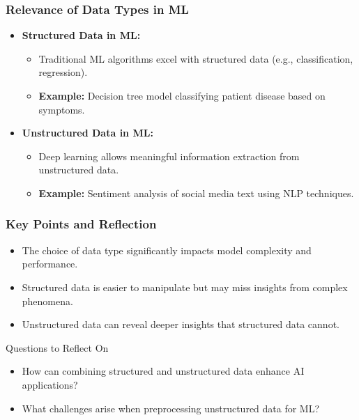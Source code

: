 \documentclass[aspectratio=169]{beamer}
\begin{document}
\begin{frame}[fragile]
    \frametitle{Relevance of Data Types in ML}
    \begin{itemize}
        \item \textbf{Structured Data in ML:}
        \begin{itemize}
            \item Traditional ML algorithms excel with structured data (e.g., classification, regression).
            \item \textbf{Example:} Decision tree model classifying patient disease based on symptoms.
        \end{itemize}
        
        \item \textbf{Unstructured Data in ML:}
        \begin{itemize}
            \item Deep learning allows meaningful information extraction from unstructured data.
            \item \textbf{Example:} Sentiment analysis of social media text using NLP techniques.
        \end{itemize}
    \end{itemize}
\end{frame}

\begin{frame}[fragile]
    \frametitle{Key Points and Reflection}
    \begin{itemize}
        \item The choice of data type significantly impacts model complexity and performance.
        \item Structured data is easier to manipulate but may miss insights from complex phenomena.
        \item Unstructured data can reveal deeper insights that structured data cannot.
    \end{itemize}

    \begin{block}{Questions to Reflect On}
        \begin{itemize}
            \item How can combining structured and unstructured data enhance AI applications?
            \item What challenges arise when preprocessing unstructured data for ML?
        \end{itemize}
    \end{block}
\end{frame}
\end{document}
